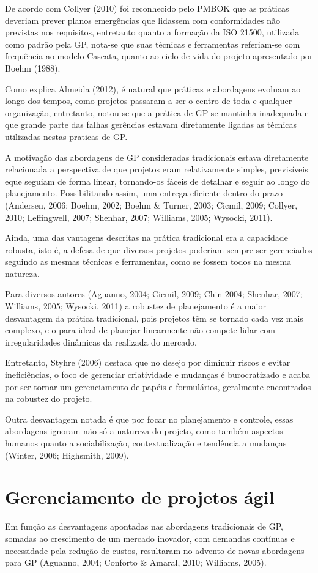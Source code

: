 De acordo com Collyer (2010) foi reconhecido pelo PMBOK que as práticas deveriam prever planos emergências que lidassem com conformidades não previstas nos requisitos, entretanto quanto a formação da ISO 21500, utilizada como padrão pela GP, nota-se que suas técnicas e ferramentas referiam-se com frequência ao modelo Cascata, quanto ao ciclo de vida do projeto apresentado por Boehm (1988).

Como explica Almeida (2012), é natural que práticas e abordagens evoluam ao longo dos tempos, como projetos passaram a ser o centro de toda e qualquer organização, entretanto, notou-se que a prática de GP se mantinha inadequada e que grande parte das falhas gerências estavam diretamente ligadas as técnicas utilizadas nestas praticas de GP.

A motivação das abordagens de GP consideradas tradicionais estava diretamente relacionada a perspectiva de que projetos eram relativamente simples, previsíveis eque seguiam de forma linear, tornando-os fáceis de detalhar e seguir ao longo do planejamento. Possibilitando assim, uma entrega eficiente dentro do prazo (Andersen, 2006; Boehm, 2002; Boehm \& Turner, 2003; Cicmil, 2009; Collyer, 2010; Leffingwell, 2007; Shenhar, 2007; Williams, 2005; Wysocki, 2011).

Ainda, uma das vantagens descritas na prática tradicional era a capacidade robusta, isto é, a defesa de que diversos projetos poderiam sempre ser gerenciados seguindo as mesmas técnicas e ferramentas, como se fossem todos na mesma natureza.

Para diversos autores (Aguanno, 2004; Cicmil, 2009; Chin 2004; Shenhar, 2007; Williams, 2005; Wysocki, 2011) a robustez de planejamento é a maior desvantagem da prática tradicional, pois projetos têm se tornado cada vez mais complexo, e o para ideal de planejar linearmente não compete lidar com irregularidades dinâmicas da realizada do mercado.

Entretanto, Styhre (2006) destaca que no desejo por diminuir riscos e evitar ineficiências, o foco de gerenciar criatividade e mudanças é burocratizado e acaba por ser tornar um gerenciamento de papéis e formulários, geralmente encontrados na robustez do projeto.

Outra desvantagem notada é que por focar no planejamento e controle, essas abordagens ignoram não só a natureza do projeto, como também aspectos humanos quanto a sociabilização, contextualização e tendência a mudanças (Winter, 2006; Highsmith, 2009).


\section{Gerenciamento de projetos ágil}
Em função as desvantagens apontadas nas abordagens tradicionais de GP, somadas ao crescimento de um mercado inovador, com demandas contínuas e necessidade pela redução de custos, resultaram no advento de novas abordagens para GP (Aguanno, 2004; Conforto \& Amaral, 2010; Williams, 2005).

